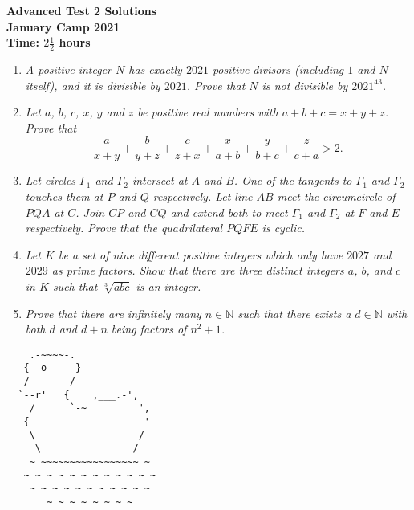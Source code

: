 \documentclass{article}
\begin{document}
\thispagestyle{empty}

\begin{center}
  \textbf{\Large Advanced Test 2 Solutions}
  \\ \vspace{1em}
  \textbf{\large January Camp 2021}
  \\ \vspace{1em}
  \textbf{\large Time: $2\frac{1}{2}$ hours}
\end{center}

\vspace{24pt}

\begin{enumerate}[1.]

  \item %
  {\itshape A positive integer $N$ has exactly $2021$ positive divisors (including $1$ and $N$ itself), and it is divisible by $2021$.
  Prove that $N$ is not divisible by $2021^{43}$.}
  
  
  \item %
  {\itshape Let $a$, $b$, $c$, $x$, $y$ and $z$ be positive real numbers with $a + b + c = x + y + z$.
  Prove that 
  \[ \frac{a}{x + y} + \frac{b}{y + z} + \frac{c}{z + x} + \frac{x}{a + b} + \frac{y}{b + c} + \frac{z}{c + a} > 2. \]}
  
  
  \item %
  {\itshape Let circles $\Gamma_1$ and $\Gamma_2$ intersect at $A$ and $B$. One of the tangents to $\Gamma_1$ and $\Gamma_2$ touches them at $P$ and $Q$ respectively. Let line $AB$ meet the circumcircle of $PQA$ at $C$. Join $CP$ and $CQ$ and extend both to meet $\Gamma_1$ and $\Gamma_2$ at $F$ and $E$ respectively. Prove that the quadrilateral $PQFE$ is cyclic.}
  
  
  \item %
  {\itshape Let $K$ be a set of nine different positive integers which only have $2027$ and $2029$ as prime factors.
  Show that there are three distinct integers $a$, $b$, and $c$ in $K$ such that $\sqrt[3]{abc}$ is an integer.}
  
  
  \item %
  {\itshape Prove that there are infinitely many $n \in \mathbb{N}$ such that there exists a $d \in \mathbb{N}$ with both $d$ and $d + n$ being factors of $n^2 + 1$.}
  
  \end{enumerate}
  
  \vfill
  \centering
  \begin{BVerbatim}
    .-~~~~-.
   {  o     }
   /       /
  `--r'   {    ,___.-',
    /      `-~         ',
   {                    '
    \                  /
     \                /
    ~ ~~~~~~~~~~~~~~~~~ ~
   ~ ~ ~ ~ ~ ~ ~ ~ ~ ~ ~ ~
    ~ ~ ~ ~ ~ ~ ~ ~ ~ ~ ~
       ~ ~ ~ ~ ~ ~ ~ ~
  \end{BVerbatim}
  
  
\end{document}

